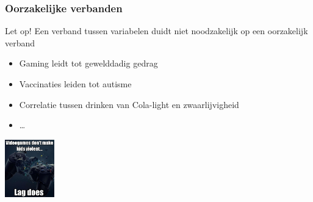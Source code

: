 \documentclass{beamer}
\begin{document}
\begin{frame}
  \frametitle{Oorzakelijke verbanden}

  \begin{alertblock}{Let op!}
  Een verband tussen variabelen duidt niet noodzakelijk op een oorzakelijk verband
  \end{alertblock}

  \begin{itemize}
    \item Gaming leidt tot gewelddadig gedrag
    \item Vaccinaties leiden tot autisme
    \item Correlatie tussen drinken van Cola-light en zwaarlijvigheid
    \item \ldots
  \end{itemize}

  \begin{center}
    \includegraphics[height=2.5cm]{img/les1-10}
  \end{center}
\end{frame}

\end{document}
